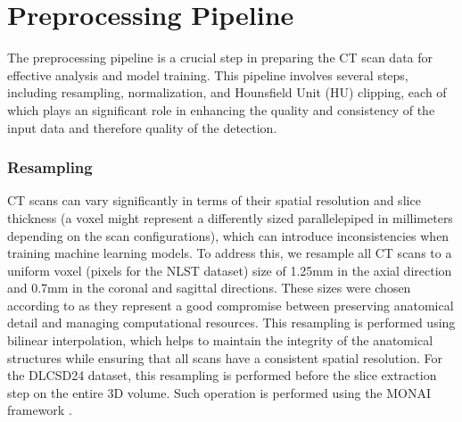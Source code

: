 




\section{Preprocessing Pipeline}
\label{sec:preprocessing}

The preprocessing pipeline is a crucial step in preparing the CT scan data for effective analysis and model training. This pipeline involves several steps, including resampling, normalization, and Hounsfield Unit (HU) clipping, each of which plays an significant role in enhancing the quality and consistency of the input data and therefore quality of the detection.

\subsubsection{Resampling}
\label{sec:resampling}
CT scans can vary significantly in terms of their spatial resolution and slice thickness (a voxel might represent a differently sized parallelepiped in millimeters depending on the scan configurations), which can introduce inconsistencies when training machine learning models. To address this, we resample all CT scans to a uniform voxel (pixels for the NLST dataset) size of 1.25mm in the axial direction and 0.7mm in the coronal and sagittal directions.
These sizes were chosen according to \cite{tushar2025ailunghealthbenchmarking} as they represent a good compromise between preserving anatomical detail and managing computational resources.
This resampling is performed using bilinear interpolation, which helps to maintain the integrity of the anatomical structures while ensuring that all scans have a consistent spatial resolution.
For the DLCSD24 dataset, this resampling is performed before the slice extraction step on the entire 3D volume. Such operation is performed using the MONAI framework \cite{monai}.

